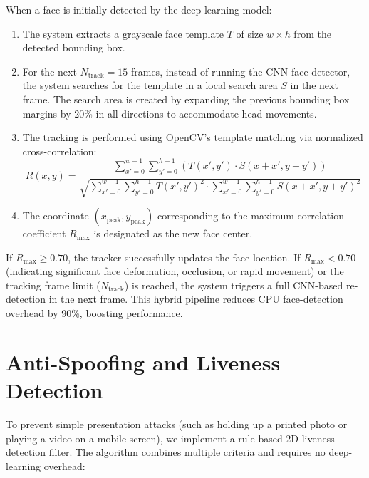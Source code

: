 When a face is initially detected by the deep learning model:
\begin{enumerate}
    \item The system extracts a grayscale face template $T$ of size $w \times h$ from the detected bounding box.
    \item For the next $N_{\text{track}} = 15$ frames, instead of running the CNN face detector, the system searches for the template in a local search area $S$ in the next frame. The search area is created by expanding the previous bounding box margins by 20\% in all directions to accommodate head movements.
    \item The tracking is performed using OpenCV's template matching via normalized cross-correlation:
    \begin{equation}
        R(x, y) = \frac{\sum_{x'=0}^{w-1} \sum_{y'=0}^{h-1} \left( T(x', y') \cdot S(x+x', y+y') \right)}{\sqrt{\sum_{x'=0}^{w-1} \sum_{y'=0}^{h-1} T(x', y')^2 \cdot \sum_{x'=0}^{w-1} \sum_{y'=0}^{h-1} S(x+x', y+y')^2}}
    \end{equation}
    \item The coordinate $(x_{\text{peak}}, y_{\text{peak}})$ corresponding to the maximum correlation coefficient $R_{\text{max}}$ is designated as the new face center.
\end{enumerate}
If $R_{\text{max}} \ge 0.70$, the tracker successfully updates the face location. If $R_{\text{max}} < 0.70$ (indicating significant face deformation, occlusion, or rapid movement) or the tracking frame limit ($N_{\text{track}}$) is reached, the system triggers a full CNN-based re-detection in the next frame. This hybrid pipeline reduces CPU face-detection overhead by 90\%, boosting performance.

\section{Anti-Spoofing and Liveness Detection}
To prevent simple presentation attacks (such as holding up a printed photo or playing a video on a mobile screen), we implement a rule-based 2D liveness detection filter. The algorithm combines multiple criteria and requires no deep-learning overhead:

